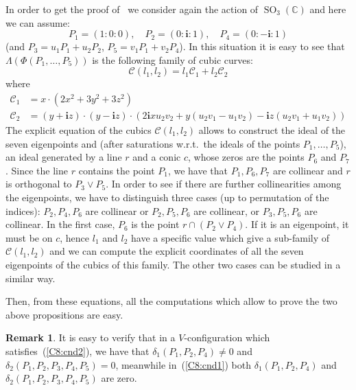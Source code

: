 \documentclass{amsart}
\theoremstyle{plain}
\theoremstyle{definition}
\newtheorem{rmk}[lemma]{Remark}
\newcommand{\C}{\mathbb{C}}
\newcommand{\SO}{\operatorname{SO}}
\newcommand{\iii}{\textbf{i}}
\begin{document}
In order to get the proof of~
we consider again the action of $\SO_3(\C)$ and here we can assume:
\[
P_1 = (1: 0: 0), \quad P_2 = (0: \iii: 1), \quad P_4 = (0: -\iii: 1)
\]
(and $P_3 = u_1P_1+u_2P_2$, $P_5 = v_1P_1+v_2P_4$). In this situation it
is easy to see that $\Lambda(\Phi(P_1, \dots, P_5))$
is the following family of cubic curves:
\[
\mathcal{C}(l_1, l_2) = l_1\mathcal{C}_1+l_2\mathcal{C}_2
\]
where
\begin{align*}
  \mathcal{C}_1 & = x \cdot \left(2x^{2} + 3 y^{2} + 3 z^{2}\right)\\
  \mathcal{C}_2 & = (y + \iii z) \cdot (y - \iii z)
\cdot \left(2 \iii x u_{2} v_{2} + y (u_{2} v_{1}- u_{1} v_{2})
- \iii z (u_{2} v_{1} + u_{1} v_{2})\right)
\end{align*}
The explicit equation of the cubics $\mathcal{C}(l_1, l_2)$ allows to
construct the ideal of the seven eigenpoints and (after
saturations w.r.t.\ the ideals of the points $P_1, \dotsc, P_5$),
an ideal generated by a line $r$ and a conic $c$, whose zeros are
the points $P_6$ and $P_7$. Since the line $r$ contains the point $P_1$,
we have that $P_1, P_6, P_7$ are collinear and $r$ is orthogonal to
$P_3\vee P_5$. In order to see if there are further collinearities among the
eigenpoints, we have to distinguish three cases (up to permutation
of the indices): $P_2, P_4, P_6$ are collinear or $P_2, P_5, P_6$ are
collinear, or $P_3, P_5, P_6$ are collinear. In the first case, $P_6$
is the point $r \cap (P_2\vee P_4)$. If it is an eigenpoint, it must be
on $c$, hence $l_1$ and $l_2$ have a specific value which give a sub-family
of $\mathcal{C}(l_1, l_2)$ and we can compute the explicit coordinates of
all the seven eigenpoints of the cubics of this family. The other two
cases can be studied in a similar way.

Then, from these equations, all the computations which allow to prove
the two above propositions are easy.
%
\begin{rmk}
\label{rmk:delta1_and_delta2}
It is easy to verify that in
a $V$-configuration which satisfies~(\ref{C8:cnd2}), we have that
$\delta_1(P_1, P_2, P_4)\neq 0$ and
$\delta_2(P_1, P_2, P_3, P_4, P_5) = 0$,
meanwhile in~(\ref{C8:cnd1}) both $\delta_1(P_1, P_2, P_4)$ and
$\delta_2(P_1, P_2, P_3, P_4, P_5)$ are zero.
\end{rmk}
\end{document}
